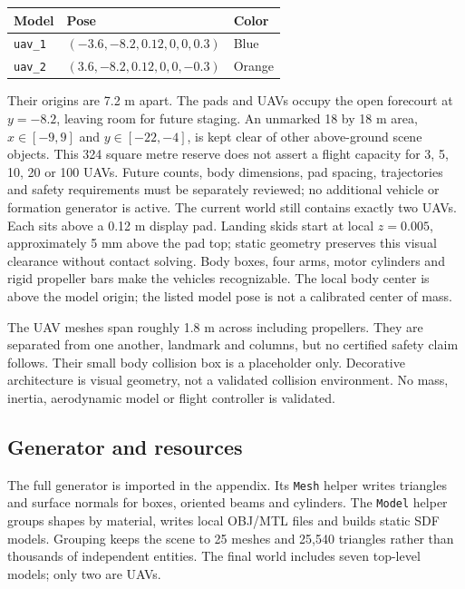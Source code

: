 \begin{center}\begin{tabular}{lll}\toprule
Model & Pose & Color\\\midrule
\texttt{uav\_1} & $(-3.6,-8.2,0.12,0,0,0.3)$ & Blue\\
\texttt{uav\_2} & $(3.6,-8.2,0.12,0,0,-0.3)$ & Orange\\\bottomrule
\end{tabular}\end{center}
Their origins are 7.2 m apart. The pads and UAVs occupy the open forecourt at $y=-8.2$, leaving room for future staging. An unmarked 18 by 18 m area, $x\in[-9,9]$ and $y\in[-22,-4]$, is kept clear of other above-ground scene objects. This 324 square metre reserve does not assert a flight capacity for 3, 5, 10, 20 or 100 UAVs. Future counts, body dimensions, pad spacing, trajectories and safety requirements must be separately reviewed; no additional vehicle or formation generator is active. The current world still contains exactly two UAVs. Each sits above a 0.12 m display pad. Landing skids start at local $z=0.005$, approximately 5 mm above the pad top; static geometry preserves this visual clearance without contact solving. Body boxes, four arms, motor cylinders and rigid propeller bars make the vehicles recognizable. The local body center is above the model origin; the listed model pose is not a calibrated center of mass.

The UAV meshes span roughly 1.8 m across including propellers. They are separated from one another, landmark and columns, but no certified safety claim follows. Their small body collision box is a placeholder only. Decorative architecture is visual geometry, not a validated collision environment. No mass, inertia, aerodynamic model or flight controller is validated.

\subsection{Generator and resources}
The full generator is imported in the appendix. Its \texttt{Mesh} helper writes triangles and surface normals for boxes, oriented beams and cylinders. The \texttt{Model} helper groups shapes by material, writes local OBJ/MTL files and builds static SDF models. Grouping keeps the scene to 25 meshes and 25,540 triangles rather than thousands of independent entities. The final world includes seven top-level models; only two are UAVs.

